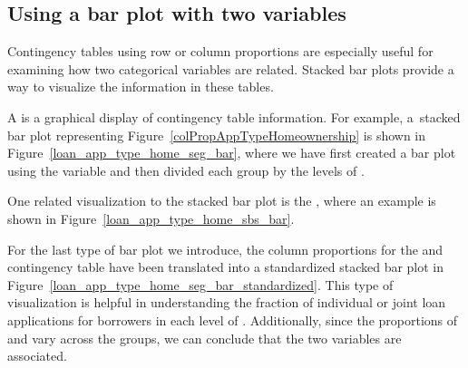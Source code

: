 \subsection{Using a bar plot with two variables}
\label{bar_plots_subsection}

Contingency tables using row or column proportions
are especially useful for examining how two categorical
variables are related.
Stacked bar plots provide a way to visualize
the information in these tables.

A 
is a graphical display of contingency table information.
For example, a~stacked bar plot representing
Figure~\ref{colPropAppTypeHomeownership}
is shown in Figure~\ref{loan_app_type_home_seg_bar},
where we have first created a bar plot using the
 variable and then divided each group
by the levels of \mbox{}.

One related visualization to the stacked bar plot is the
,
where an example is shown in
Figure~\ref{loan_app_type_home_sbs_bar}.

For the last type of bar plot we introduce,
the column proportions for the
 and  contingency table
have been translated into a standardized stacked bar plot
in Figure~\ref{loan_app_type_home_seg_bar_standardized}.
This type of visualization is helpful in understanding
the fraction of individual or joint loan applications
for borrowers in each level of .
Additionally, since the proportions of 
and  vary across the groups,
we can conclude that the two variables are associated.

